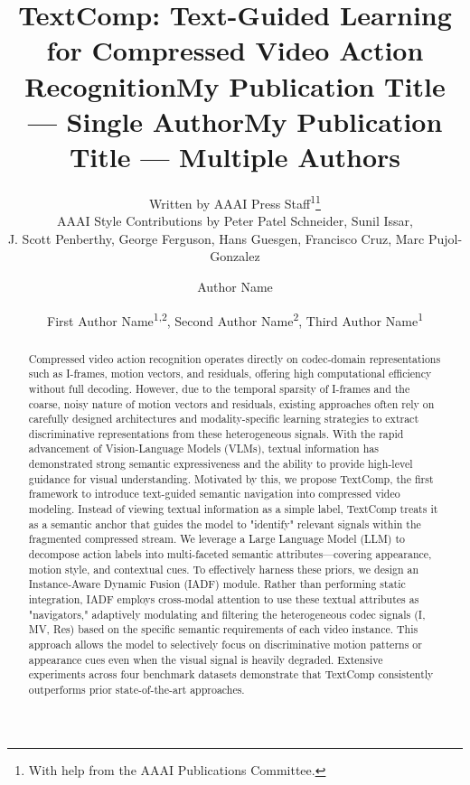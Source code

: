 \documentclass[letterpaper]{article} %
\title{TextComp: Text-Guided Learning for Compressed Video Action Recognition} %
\author{
    Written by AAAI Press Staff\textsuperscript{\rm 1}\thanks{With help from the AAAI Publications Committee.}\\
    AAAI Style Contributions by Peter Patel Schneider,
    Sunil Issar,\\
    J. Scott Penberthy,
    George Ferguson,
    Hans Guesgen,
    Francisco Cruz\equalcontrib\corresponding,
    Marc Pujol-Gonzalez\equalcontrib\corresponding
}
\title{My Publication Title --- Single Author}
\author {
    Author Name
}
\title{My Publication Title --- Multiple Authors}
\author {
    First Author Name\textsuperscript{\rm 1,\rm 2}\equalcontrib,
    Second Author Name\textsuperscript{\rm 2}\equalcontrib,
    Third Author Name\textsuperscript{\rm 1}\corresponding
}
\begin{document}
\maketitle

\begin{abstract}
Compressed video action recognition operates directly on codec-domain representations such as I-frames, motion vectors, and residuals, offering high computational efficiency without full decoding. However, due to the temporal sparsity of I-frames and the coarse, noisy nature of motion vectors and residuals, existing approaches often rely on carefully designed architectures and modality-specific learning strategies to extract discriminative representations from these heterogeneous signals. With the rapid advancement of Vision-Language Models (VLMs), textual information has demonstrated strong semantic expressiveness and the ability to provide high-level guidance for visual understanding. 
Motivated by this, we propose TextComp, the first framework to introduce text-guided semantic navigation into compressed video modeling. Instead of viewing textual information as a simple label, TextComp treats it as a semantic anchor that guides the model to "identify" relevant signals within the fragmented compressed stream. We leverage a Large Language Model (LLM) to decompose action labels into multi-faceted semantic attributes—covering appearance, motion style, and contextual cues.
To effectively harness these priors, we design an Instance-Aware Dynamic Fusion (IADF) module. Rather than performing static integration, IADF employs cross-modal attention to use these textual attributes as "navigators," adaptively modulating and filtering the heterogeneous codec signals (I, MV, Res) based on the specific semantic requirements of each video instance. This approach allows the model to selectively focus on discriminative motion patterns or appearance cues even when the visual signal is heavily degraded.
Extensive experiments across four benchmark datasets demonstrate that TextComp consistently outperforms prior state-of-the-art approaches.
\end{abstract}

\begin{links}
\end{links}
\end{document}
